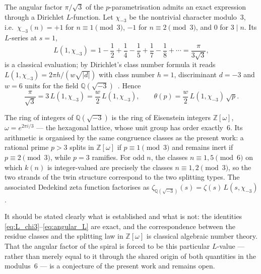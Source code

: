 
\begin{remark}
\label{rem:eisenstein_L}
The angular factor $\pi/\sqrt{3}$ of the $p$-parametrisation admits an
exact expression through a Dirichlet $L$-function. Let $\chi_{-3}$ be
the nontrivial character modulo~$3$, i.e.\ $\chi_{-3}(n) = +1$ for
$n \equiv 1 \pmod 3$, $-1$ for $n \equiv 2 \pmod 3$, and $0$ for
$3 \mid n$. Its $L$-series at $s=1$,
\begin{equation}\label{eq:L_chi3}
  L(1,\chi_{-3})
  = 1 - \frac12 + \frac14 - \frac15 + \frac17 - \frac18 + \cdots
  = \frac{\pi}{3\sqrt{3}},
\end{equation}
is a classical evaluation; by Dirichlet's class number formula it reads
$L(1,\chi_{-3}) = 2\pi h / (w\sqrt{|d|})$ with class number $h = 1$,
discriminant $d = -3$ and $w = 6$ units for the field
$\mathbb{Q}(\sqrt{-3})$~\cite{IrelandRosen1990}. Hence
\begin{equation}\label{eq:angular_L}
  \frac{\pi}{\sqrt{3}} = 3\,L(1,\chi_{-3}) = \frac{w}{2}\,L(1,\chi_{-3}),
  \qquad
  \theta(p) = \frac{w}{2}\,L(1,\chi_{-3})\,\sqrt{p}.
\end{equation}

The ring of integers of $\mathbb{Q}(\sqrt{-3})$ is the ring of
Eisenstein integers $\mathbb{Z}[\omega]$, $\omega = e^{2\pi i/3}$ ---
the hexagonal lattice, whose unit group has order exactly~$6$. Its
arithmetic is organised by the same congruence classes as the present
work: a rational prime $p > 3$ splits in $\mathbb{Z}[\omega]$ if
$p \equiv 1 \pmod 3$ and remains inert if $p \equiv 2 \pmod 3$, while
$p = 3$ ramifies. For odd $n$, the classes $n \equiv 1, 5 \pmod 6$ on
which $k(n)$ is integer-valued are precisely the classes
$n \equiv 1, 2 \pmod 3$, so the two strands of the twin structure
correspond to the two splitting types. The associated Dedekind zeta
function factorises as
$\zeta_{\mathbb{Q}(\sqrt{-3})}(s) = \zeta(s)\,L(s,\chi_{-3})$.

It should be stated clearly what is established and what is not: the
identities \eqref{eq:L_chi3}--\eqref{eq:angular_L} are exact, and the
correspondence between the residue classes and the splitting law in
$\mathbb{Z}[\omega]$ is classical algebraic number theory. That the
angular factor of the spiral is forced to be this particular $L$-value
--- rather than merely equal to it through the shared origin of both
quantities in the modulus~$6$ --- is a conjecture of the present work
and remains open.
\end{remark}

